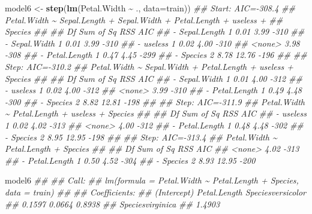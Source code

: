 \documentclass[
  notitlepage]{book}
\newenvironment{Shaded}{\begin{snugshade}}{\end{snugshade}}
\newcommand{\CommentTok}[1]{\textcolor[rgb]{0.56,0.35,0.01}{\textit{#1}}}
\newcommand{\DataTypeTok}[1]{\textcolor[rgb]{0.13,0.29,0.53}{#1}}
\newcommand{\KeywordTok}[1]{\textcolor[rgb]{0.13,0.29,0.53}{\textbf{#1}}}
\newcommand{\NormalTok}[1]{#1}
\newcommand{\OperatorTok}[1]{\textcolor[rgb]{0.81,0.36,0.00}{\textbf{#1}}}
\newcommand{\StringTok}[1]{\textcolor[rgb]{0.31,0.60,0.02}{#1}}
\begin{document}
\begin{Shaded}
\begin{Highlighting}[]
\NormalTok{model6 \textless{}{-}}\StringTok{ }\KeywordTok{step}\NormalTok{(}\KeywordTok{lm}\NormalTok{(Petal.Width }\OperatorTok{\textasciitilde{}}\StringTok{ }\NormalTok{., }\DataTypeTok{data=}\NormalTok{train))}
\CommentTok{\#\# Start:  AIC={-}308.4}
\CommentTok{\#\# Petal.Width \textasciitilde{} Sepal.Length + Sepal.Width + Petal.Length + useless + }
\CommentTok{\#\#     Species}
\CommentTok{\#\# }
\CommentTok{\#\#                Df Sum of Sq   RSS  AIC}
\CommentTok{\#\# {-} Sepal.Length  1      0.01  3.99 {-}310}
\CommentTok{\#\# {-} Sepal.Width   1      0.01  3.99 {-}310}
\CommentTok{\#\# {-} useless       1      0.02  4.00 {-}310}
\CommentTok{\#\# \textless{}none\textgreater{}                       3.98 {-}308}
\CommentTok{\#\# {-} Petal.Length  1      0.47  4.45 {-}299}
\CommentTok{\#\# {-} Species       2      8.78 12.76 {-}196}
\CommentTok{\#\# }
\CommentTok{\#\# Step:  AIC={-}310.2}
\CommentTok{\#\# Petal.Width \textasciitilde{} Sepal.Width + Petal.Length + useless + Species}
\CommentTok{\#\# }
\CommentTok{\#\#                Df Sum of Sq   RSS  AIC}
\CommentTok{\#\# {-} Sepal.Width   1      0.01  4.00 {-}312}
\CommentTok{\#\# {-} useless       1      0.02  4.00 {-}312}
\CommentTok{\#\# \textless{}none\textgreater{}                       3.99 {-}310}
\CommentTok{\#\# {-} Petal.Length  1      0.49  4.48 {-}300}
\CommentTok{\#\# {-} Species       2      8.82 12.81 {-}198}
\CommentTok{\#\# }
\CommentTok{\#\# Step:  AIC={-}311.9}
\CommentTok{\#\# Petal.Width \textasciitilde{} Petal.Length + useless + Species}
\CommentTok{\#\# }
\CommentTok{\#\#                Df Sum of Sq   RSS  AIC}
\CommentTok{\#\# {-} useless       1      0.02  4.02 {-}313}
\CommentTok{\#\# \textless{}none\textgreater{}                       4.00 {-}312}
\CommentTok{\#\# {-} Petal.Length  1      0.48  4.48 {-}302}
\CommentTok{\#\# {-} Species       2      8.95 12.95 {-}198}
\CommentTok{\#\# }
\CommentTok{\#\# Step:  AIC={-}313.4}
\CommentTok{\#\# Petal.Width \textasciitilde{} Petal.Length + Species}
\CommentTok{\#\# }
\CommentTok{\#\#                Df Sum of Sq   RSS  AIC}
\CommentTok{\#\# \textless{}none\textgreater{}                       4.02 {-}313}
\CommentTok{\#\# {-} Petal.Length  1      0.50  4.52 {-}304}
\CommentTok{\#\# {-} Species       2      8.93 12.95 {-}200}
\end{Highlighting}
\end{Shaded}

\begin{Shaded}
\begin{Highlighting}[]
\NormalTok{model6}
\CommentTok{\#\# }
\CommentTok{\#\# Call:}
\CommentTok{\#\# lm(formula = Petal.Width \textasciitilde{} Petal.Length + Species, data = train)}
\CommentTok{\#\# }
\CommentTok{\#\# Coefficients:}
\CommentTok{\#\#       (Intercept)       Petal.Length  Speciesversicolor  }
\CommentTok{\#\#            0.1597             0.0664             0.8938  }
\CommentTok{\#\#  Speciesvirginica  }
\CommentTok{\#\#            1.4903}
\end{Highlighting}
\end{Shaded}
\end{document}
